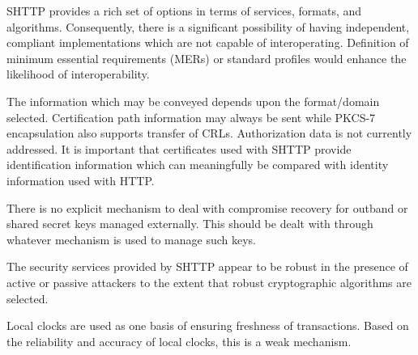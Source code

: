   SHTTP provides a rich set of options in terms of services, formats, and
  algorithms. Consequently, there is a significant possibility of having
  independent, compliant implementations which are not capable of
  interoperating. Definition of minimum essential requirements (MERs) or
  standard profiles would enhance the likelihood of interoperability.

  
  The information which may be conveyed depends upon the format/domain
  selected. Certification path information may always be sent while PKCS-7
  encapsulation also supports transfer of CRLs. Authorization data is not
  currently addressed. It is important that certificates used with SHTTP
  provide identification information which can meaningfully be compared
  with identity information used with HTTP.

  
  There is no explicit mechanism to deal with compromise recovery for
  outband or shared secret keys managed externally. This should be dealt
  with through whatever mechanism is used to manage such keys.

  
  The security services provided by SHTTP appear to be robust in the
  presence of active or passive attackers to the extent that robust
  cryptographic algorithms are selected.

  
  Local clocks are used as one basis of ensuring freshness of transactions.
  Based on the reliability and accuracy of local clocks, this is a weak
  mechanism.

  
